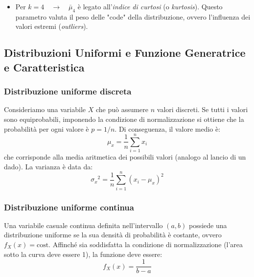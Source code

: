 \documentclass[openany,a4paper,12pt]{book}
\theoremstyle{remark}
\begin{document}
\begin{itemize}
\begin{itemize}
        \item per una distribuzione asimmetrica a sinistra $\bar{\mu}_3<0$
    \begin{center}
        \end{center}

    \end{itemize}     

        \item Per $k=4 \quad \to \quad \bar{\mu}_4$ è legato all'\textit{indice di curtosi} (o \textit{kurtosis}). Questo parametro valuta il peso delle "code" della distribuzione, ovvero l'influenza dei valori estremi (\textit{outliers}).

\end{itemize}

\subsection{Distribuzioni Uniformi e Funzione Generatrice e Caratteristica}
\subsubsection*{Distribuzione uniforme discreta}
Consideriamo una variabile $X$ che può assumere $n$ valori discreti. Se tutti i valori sono equiprobabili, imponendo la condizione di normalizzazione si ottiene che la probabilità per ogni valore è $p=1/n$.
Di conseguenza, il valore medio è:
\[
\mu_x=\frac{1}{n}\sum_{i=1}^{n}x_i
\]
che corrisponde alla media aritmetica dei possibili valori (analogo al lancio di un dado).
La varianza è data da:
\[
{\sigma_x}^2=\frac{1}{n} \sum_{i=1}^{n}(x_i-\mu_x)^2
\]


\subsubsection*{Distribuzione uniforme continua}
Una variabile casuale continua definita nell'intervallo $(a,b)$ possiede una distribuzione uniforme se la sua densità di probabilità è costante, ovvero $f_X(x) = \text{cost}$.
Affinché sia soddisfatta la condizione di normalizzazione (l'area sotto la curva deve essere 1), la funzione deve essere:
\[
f_X(x)=\frac{1}{b-a}
\]
\end{document}
